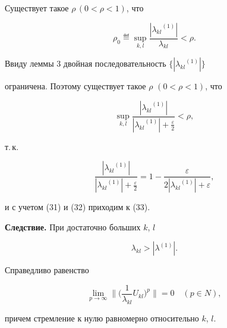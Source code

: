 \begin{lem}


Существует такое $\rho\,(0<\rho<1)$, что


\begin{equation}


\rho_0\eqdef \sup_{k,l}\frac{|{\lambda_{kl}}^{(1)}|}


{\lambda_{kl}}<\rho.


\end{equation}


\end{lem}





\begin{pf}


Ввиду леммы 3 двойная последовательность $\{|{\lambda_{kl}}^{(1)}|\}$


ограничена. Поэтому существует такое $\rho$ $(0<\rho<1)$, что


$$


\sup_{k,l}\frac{|{\lambda_{kl}}^{(1)}|}


{|{\lambda_{kl}}^{(1)}|+\frac{{\varepsilon}}{2}}<\rho,


$$


т.\,к.


$$


\frac{|{\lambda_{kl}}^{(1)}|}{|{\lambda_{kl}}^{(1)}|+\frac{{\varepsilon}}{2}}=


1-\frac{{\varepsilon}}{2|{\lambda_{kl}}^{(1)}|+{\varepsilon}},


$$


и с учетом (31) и (32) приходим к (33).


\end{pf}





{\bf Следствие.} При достаточно больших $k$, $l$


\begin{equation}


\lambda_{kl}>|\lambda^{(1)}|.


\end{equation}





\begin{lem}


Справедливо равенство


$$


\lim_{p\to\infty}


\bigg\|\bigg(\frac{1}{\lambda_{kl}}U_{kl}\bigg)^p\bigg\|=0\quad (p\in N),


$$


причем стремление к нулю равномерно относительно $k$, $l$.


\end{lem}





